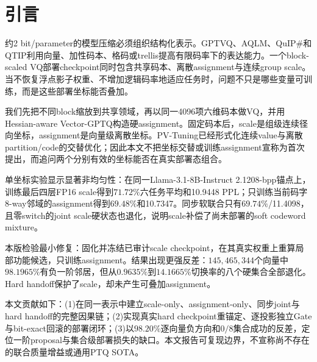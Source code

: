 \section{引言}
约2 bit/parameter的模型压缩必须组织结构化表示。GPTVQ、AQLM、QuIP\#和QTIP利用向量、加性码本、格码或trellis提高有限码率下的表达能力\cite{gptvq,aqlm,quipsharp,qtip}。一个block-scaled VQ部署checkpoint同时包含共享码本、离散assignment与连续group scale。当不恢复浮点影子权重、不增加逻辑码率地适应任务时，问题不只是哪些变量可训练，而是这些部署坐标能否叠加。

我们先把不同block缩放到共享领域，再以同一4096项六维码本做VQ，并用Hessian-aware Vector-GPTQ构造硬assignment。固定码本后，scale是组级连续径向坐标，assignment是向量级离散坐标。PV-Tuning已经形式化连续value与离散partition/code的交替优化\cite{pvtuning}；因此本文不把坐标交替或训练assignment宣称为首次提出，而追问两个分别有效的坐标能否在真实部署态组合。

单坐标实验显示显著非均匀性：在同一Llama-3.1-8B-Instruct 2.1208-bpp锚点上，训练最后四层FP16 scale得到$71.72\%$六任务平均和10.9448 PPL；只训练当前码字8-way邻域的assignment得到$69.48\%$和10.7347。同步软联合只有$69.74\%$/11.4098，且零switch的joint scale硬状态也退化，说明scale补偿了尚未部署的soft codeword mixture。

本版检验最小修复：固化并冻结已审计scale checkpoint，在其真实权重上重算局部功能候选，只训练assignment。结果出现更强反差：$145{,}465{,}344$个向量中$98.1965\%$有负一阶邻居，但从$0.9635\%$到$14.1665\%$切换率的八个硬集合全部退化。Hard handoff保护了scale，却未产生可叠加assignment。

本文贡献如下：(1)在同一表示中建立scale-only、assignment-only、同步joint与hard handoff的完整因果链；(2)实现真实hard checkpoint重锚定、逐投影独立Gate与bit-exact回滚的部署闭环；(3)以$98.20\%$逐向量负方向和$0/8$集合成功的反差，定位一阶proposal与集合级部署损失的缺口。本文报告可复现边界，不宣称尚不存在的联合质量增益或通用PTQ SOTA。
